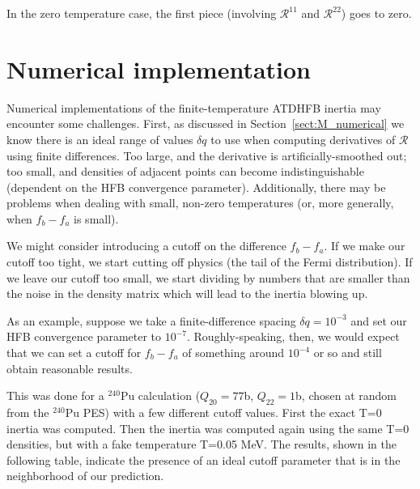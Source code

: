 \noindent In the zero temperature case, the first piece (involving $\mathcal{R}^{11}$ and $\mathcal{R}^{22}$) goes to zero.

\section{Numerical implementation}

Numerical implementations of the finite-temperature ATDHFB inertia may encounter some challenges. First, as discussed in Section~\ref{sect:M_numerical} we know there is an ideal range of values $\delta q$ to use when computing derivatives of $\mathcal{R}$ using finite differences. Too large, and the derivative is artificially-smoothed out; too small, and densities of adjacent points can become indistinguishable (dependent on the HFB convergence parameter). Additionally, there may be problems when dealing with small, non-zero temperatures (or, more generally, when $f_b-f_a$ is small).
%
%

We might consider introducing a cutoff on the difference $f_b-f_a$. If we make our cutoff too tight, we start cutting off physics (the tail of the Fermi distribution). If we leave our cutoff too small, we start dividing by numbers that are smaller than the noise in the density matrix which will lead to the inertia blowing up.

As an example, suppose we take a finite-difference spacing $\delta q = 10^{-3}$ and set our HFB convergence parameter to $10^{-7}$. Roughly-speaking, then, we would expect that we can set a cutoff for $f_b-f_a$ of something around $10^{-4}$ or so and still obtain reasonable results.

This was done for a $^{240}$Pu calculation ($Q_{20}=77$b, $Q_{22}=1$b, chosen at random from the $^{240}$Pu PES) with a few different cutoff values. First the exact T=0 inertia was computed. Then the inertia was computed again using the same T=0 densities, but with a fake temperature T=0.05 MeV. The results, shown in the following table, indicate the presence of an ideal cutoff parameter that is in the neighborhood of our prediction.

